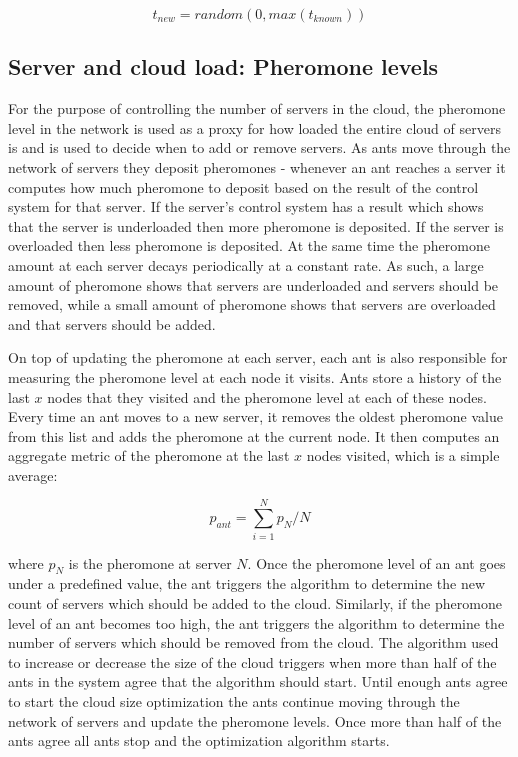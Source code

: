 \documentclass[conference]{IEEEtran}
\begin{document}
\begin{equation}
t_{new} = random(0, max(t_{known}))
\label{eq:randomnew}
\end{equation}

\subsection{Server and cloud load: Pheromone levels}

For the purpose of controlling the number of servers in the cloud, the pheromone level in the network is used as a proxy for how loaded the entire cloud of servers is and is used to decide when to add or remove servers. As ants move through the network of servers they deposit pheromones - whenever an ant reaches a server it computes how much pheromone to deposit based on the result of the control system for that server. If the server's control system has a result which shows that the server is underloaded then more pheromone is deposited. If the server is overloaded then less pheromone is deposited. At the same time the pheromone amount at each server decays periodically at a constant rate. As such, a large amount of pheromone shows that servers are underloaded and servers should be removed, while a small amount of pheromone shows that servers are overloaded and that servers should be added.

On top of updating the pheromone at each server, each ant is also responsible for measuring the pheromone level at each node it visits. Ants store a history of the last $x$ nodes that they visited and the pheromone level at each of these nodes. Every time an ant moves to a new server, it removes the oldest pheromone value from this list and adds the pheromone at the current node. It then computes an aggregate metric of the pheromone at the last $x$ nodes visited, which is a simple average:

\begin{equation}
p_{ant} = \sum_{i=1}^{N} p_{N} / N
\end{equation}

where $p_{N}$ is the pheromone at server $N$. Once the pheromone level of an ant goes under a predefined value, the ant triggers the algorithm to determine the new count of servers which should be added to the cloud. Similarly, if the pheromone level of an ant becomes too high, the ant triggers the algorithm to determine the number of servers which should be removed from the cloud. The algorithm used to increase or decrease the size of the cloud triggers when more than half of the ants in the system agree that the algorithm should start. Until enough ants agree to start the cloud size optimization the ants continue moving through the network of servers and update the pheromone levels. Once more than half of the ants agree all ants stop and the optimization algorithm starts.
\end{document}
